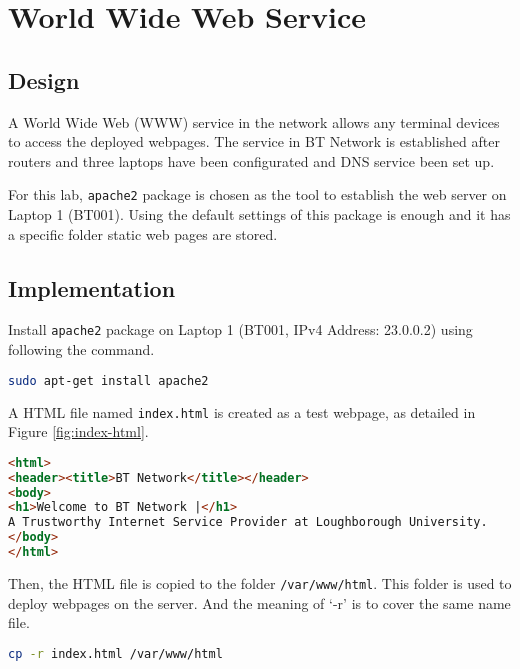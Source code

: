 \section{World Wide Web Service}
\label{sec:web}

\subsection{Design}

A World Wide Web (WWW) service\citep{rfc1630}\citep{rfc2616} in the network allows any terminal devices to access the deployed webpages. The service in BT Network is established after routers and three laptops have been configurated and DNS service been set up.

For this lab, \texttt{apache2} package is chosen as the tool to establish the web server on Laptop 1 (BT001). 
Using the default settings of this package is enough and it has a specific folder static web pages are stored. 


\subsection{Implementation}

Install \texttt{apache2} package on Laptop 1 (BT001, IPv4 Address: 23.0.0.2) using following the command.

\begin{lstlisting}[language=sh]
sudo apt-get install apache2
\end{lstlisting}

A HTML file named \texttt{index.html} is created as a test webpage, as detailed in Figure \ref{fig:index-html}.

\begin{figure*}[ht!]
\begin{lstlisting}[language=html]
<html>
<header><title>BT Network</title></header>
<body>
<h1>Welcome to BT Network |</h1>
A Trustworthy Internet Service Provider at Loughborough University.
</body>
</html>
\end{lstlisting}
\caption{Contents of HTML File Named \texttt{index.html}}
\label{fig:index-html}
\end{figure*}

Then, the HTML file is copied to the folder \texttt{/var/www/html}. This folder is used to deploy webpages on the server. And the meaning of ‘-r’ is to cover the same name file. 

\begin{lstlisting}[language=sh]
cp -r index.html /var/www/html
\end{lstlisting}

